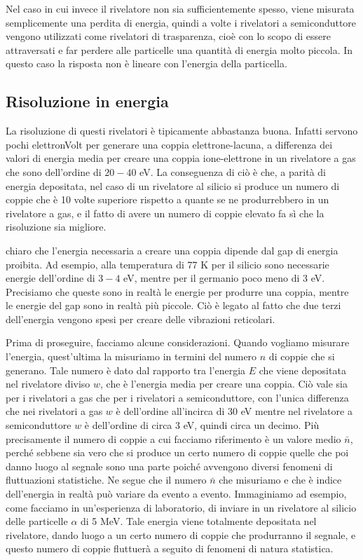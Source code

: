 Nel caso in cui invece il rivelatore non sia sufficientemente spesso, viene misurata semplicemente una perdita di energia, quindi a volte i rivelatori a semiconduttore vengono utilizzati come rivelatori di trasparenza, cioè con lo scopo di essere attraversati e far perdere alle particelle una quantità di energia molto piccola. In questo caso la risposta non è lineare con l'energia della particella.

\subsection{Risoluzione in energia}
La risoluzione di questi rivelatori è tipicamente abbastanza buona. Infatti servono pochi elettronVolt per generare una coppia elettrone-lacuna, a differenza dei valori di energia media per creare una coppia ione-elettrone in un rivelatore a gas che sono dell'ordine di $20-40$ eV. La conseguenza di ciò è che, a parità di energia depositata, nel caso di un rivelatore al silicio si produce un numero di coppie che è 10 volte superiore rispetto a quante se ne produrrebbero in un rivelatore a gas, e il fatto di avere un numero di coppie elevato fa sì che la risoluzione sia migliore.

\E chiaro che l'energia necessaria a creare una coppia dipende dal gap di energia proibita. Ad esempio, alla temperatura di 77 K per il silicio sono necessarie energie dell'ordine di $3-4$ eV, mentre per il germanio poco meno di 3 eV. Precisiamo che queste sono in realtà le energie per produrre una coppia, mentre le energie del gap sono in realtà più piccole. Ciò è legato al fatto che due terzi dell'energia vengono spesi per creare delle vibrazioni reticolari.

Prima di proseguire, facciamo alcune considerazioni. Quando vogliamo misurare l'energia, quest'ultima la misuriamo in termini del numero $n$ di coppie che si generano. Tale numero è dato dal rapporto tra l'energia $E$ che viene depositata nel rivelatore diviso $w$, che è l'energia media per creare una coppia. Ciò vale sia per i rivelatori a gas che per i rivelatori a semiconduttore, con l'unica differenza che nei rivelatori a gas $w$ è dell'ordine all'incirca di 30 eV mentre nel rivelatore a semiconduttore $w$ è dell'ordine di circa 3 eV, quindi circa un decimo. Più precisamente il numero di coppie a cui facciamo riferimento è un valore medio $\bar{n}$, perché sebbene sia vero che si produce un certo numero di coppie quelle che poi danno luogo al segnale sono una parte poiché avvengono diversi fenomeni di fluttuazioni statistiche. Ne segue che il numero $\bar{n}$ che misuriamo e che è indice dell'energia in realtà può variare da evento a evento. Immaginiamo ad esempio, come facciamo in un'esperienza di laboratorio, di inviare in un rivelatore al silicio delle particelle $\alpha$ di 5 MeV. Tale energia viene totalmente depositata nel rivelatore, dando luogo a un certo numero di coppie che produrranno il segnale, e questo numero di coppie fluttuerà a seguito di fenomeni di natura statistica.

